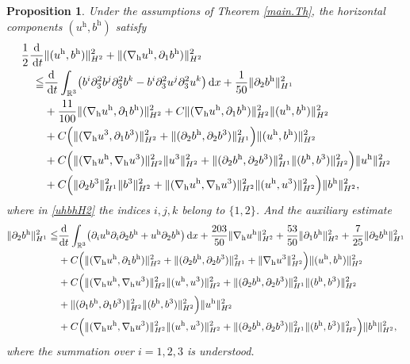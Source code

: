 \documentclass[11pt]{amsart}
\newtheorem{prop}[thm]{Proposition}
\theoremstyle{definition}
\newcommand{\R}{\mathbb{R}}
\newcommand{\dx}{\,{\rm d}x}
\newcommand{\dt}{\,{\rm d}t}
\numberwithin{equation}{section}
\begin{document}
\begin{prop}\label{h}
	Under the assumptions of Theorem \ref{main.Th}, the horizontal components $(u^\mathrm{h},b^\mathrm{h})$ satisfy
	\begin{align}\label{uhbhH2}
		\frac12 \frac{\mathrm{d}}{\dt}&\|(u^\mathrm{h},b^\mathrm{h})\|^2_{H^2}+\|(\nabla_{\mathrm{h}} u^\mathrm{h},\partial_1b^\mathrm{h})\|^2_{H^2}\nonumber\\
		\leqq &\frac{\mathrm{d}}{\dt}\int_{\R^3} \bigl(b^i\partial_3^2b^j\partial_3^2b^k-b^i\partial_3^2u^j\partial_3^2u^k\bigr)\dx+\frac{1}{50}\|\partial_2b^\mathrm{h}\|_{H^1}^2\nonumber\\
		&+\frac{11}{100}\|(\nabla_{\mathrm{h}} u^\mathrm{h},\partial_1b^\mathrm{h})\|_{H^2}^2+C\|(\nabla_{\mathrm{h}} u^\mathrm{h},\partial_1b^\mathrm{h})\|_{H^2}^2\|(u^\mathrm{h},b^\mathrm{h})\|_{H^{2}}^2\nonumber\\
		&+C\Bigl(\|(\nabla_{\mathrm{h}} u^3,\partial_1b^3)\|_{H^2}^2+\|(\partial_2b^\mathrm{h},\partial_2b^3)\|_{H^1}^2\Bigr)\|(u^\mathrm{h},b^\mathrm{h})\|_{H^2}^2\nonumber\\
		&+C\Bigl(\|(\nabla_{\mathrm{h}} u^\mathrm{h},\nabla_{\mathrm{h}} u^3)\|_{H^2}^2\|u^3\|_{H^2}^2+ \|(\partial_2b^\mathrm{h},\partial_2b^3)\|_{H^1}^2\|(b^\mathrm{h},b^3)\|_{H^2}^2\Bigr)\|u^\mathrm{h}\|_{H^2}^2\nonumber\\
		&+C\Bigl(\|\partial_2b^3\|_{H^1}^2\|b^3\|_{H^2}^2+\|(\nabla_{\mathrm{h}} u^\mathrm{h},\nabla_{\mathrm{h}} u^3)\|_{H^2}^2\|(u^\mathrm{h},u^3)\|_{H^2}^2\Bigr)\|b^\mathrm{h}\|_{H^2}^2,
	\end{align}
	where in \eqref{uhbhH2} the indices $i,j,k$ belong to $\{1,2\}$. And the auxiliary estimate
	\begin{align}\label{p2bhH1}
		\|\partial_2 b^\mathrm{h}\|_{H^1}^2\leqq&\frac{\mathrm{d}}{\mathrm{d}t}\int_{\R^3}\bigl(\partial_{i}u^\mathrm{h}\partial_{i}\partial_{2}b^\mathrm{h}+ u^\mathrm{h}\partial_2 b^\mathrm{h}\bigr)\dx+\frac{203}{50}\|\nabla_{\mathrm{h}} u^\mathrm{h}\|_{H^2}^2+\frac{53}{50}\|\partial_1 b^\mathrm{h}\|_{H^2}^2+\frac{7}{25}\|\partial_2 b^\mathrm{h}\|_{H^1}^2\nonumber\\
		&+C\Bigl(\|(\nabla_{\mathrm{h}} u^\mathrm{h},\partial_1b^\mathrm{h})\|_{H^2}^2+\|(\partial_2b^\mathrm{h},\partial_2b^3)\|_{H^1}^2+\|\nabla_{\mathrm{h}}u^3\|_{H^{2}}^2\Bigr)\|(u^\mathrm{h},b^\mathrm{h})\|_{H^{2}}^2\nonumber\\
		&+C\Big(\|(\nabla_{\mathrm{h}} u^\mathrm{h},\nabla_{\mathrm{h}} u^3)\|_{H^2}^2\|( u^\mathrm{h}, u^3)\|_{H^2}^2+ \|(\partial_2b^\mathrm{h},\partial_2b^3)\|_{H^1}^2\|(b^\mathrm{h},b^3)\|_{H^2}^2\nonumber\\
		&+\|(\partial_1b^\mathrm{h},\partial_1b^3)\|_{H^2}^2\|(b^\mathrm{h},b^3)\|_{H^2}^2\Big)\|u^\mathrm{h}\|_{H^2}^2\nonumber\\
		&+C\Bigl(\|(\nabla_{\mathrm{h}} u^\mathrm{h},\nabla_{\mathrm{h}} u^3)\|_{H^2}^2\|( u^\mathrm{h}, u^3)\|_{H^2}^2+ \|(\partial_2b^\mathrm{h},\partial_2b^3)\|_{H^1}^2\|(b^\mathrm{h},b^3)\|_{H^2}^2\Bigr)\|b^\mathrm{h}\|_{H^2}^2,
	\end{align}
	where the summation over $i=1,2,3$ is understood.
\end{prop}
\end{document}
